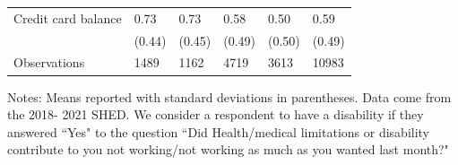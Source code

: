 \documentclass[12pt]{article}
\begin{document}
\begin{table}[!ht]
\begin{tabular}{llllll}
        Credit card balance & 0.73  & 0.73  & 0.58  & 0.50  & 0.59  \\ 
        ~ & (0.44) & (0.45) & (0.49) & (0.50) & (0.49) \\ 
        Observations & 1489 & 1162 & 4719 & 3613 & 10983 \\ \hline\hline
    \end{tabular}
    \label{SHED_Sumstats}
     \medskip 
\begin{minipage}{0.85\textwidth} 
{\footnotesize Notes: Means reported with standard deviations in parentheses. Data come from the 2018- 2021 SHED. We consider a respondent to have a disability if they answered ``Yes" to the question ``Did Health/medical limitations or disability  contribute to you not working/not working as much as you wanted last month?" \par}
\end{minipage}
\end{table}
\end{document}
